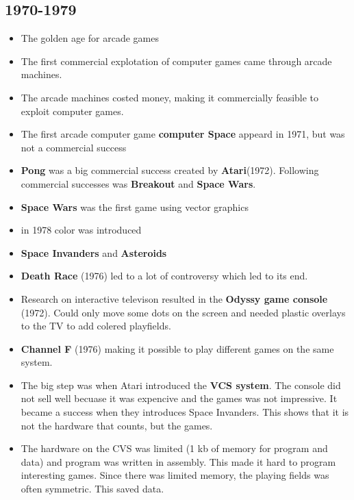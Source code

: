   \subsection*{1970-1979}
    \begin{itemize}
      \item The golden age for arcade games
      \item The first commercial explotation of computer games came through arcade machines.
      \item The arcade machines costed money, making it commercially feasible to exploit computer games. 
      \item The first arcade computer game {\bf computer Space} appeard in 1971, but was not a commercial success
      \item {\bf Pong} was a big commercial success created by {\bf Atari}(1972). Following commercial successes was {\bf Breakout} and {\bf Space Wars}.
      \item {\bf Space Wars} was the first game using vector graphics
      \item in 1978 color was introduced
      \item {\bf Space Invanders} and {\bf Asteroids}
      \item {\bf Death Race} (1976) led to a lot of controversy which led to its end.
      \item Research on interactive televison resulted in the {\bf Odyssy game console} (1972). Could only move some dots on the screen and needed plastic overlays to the TV to add colered playfields.
      \item {\bf Channel F} (1976) making it possible to play different games on the same system.
      \item The big step was when Atari introduced the {\bf VCS system}. The console did not sell well becuase it was expencive and the games was not impressive. It became a success when they introduces Space Invanders. This shows that it is not the hardware that counts, but the games.
      \item The hardware on the CVS was limited (1 kb of memory for program and data) and program was written in assembly. This made it hard to program interesting games. 
      Since there was limited memory, the playing fields was often symmetric. This saved data.
    \end{itemize}

